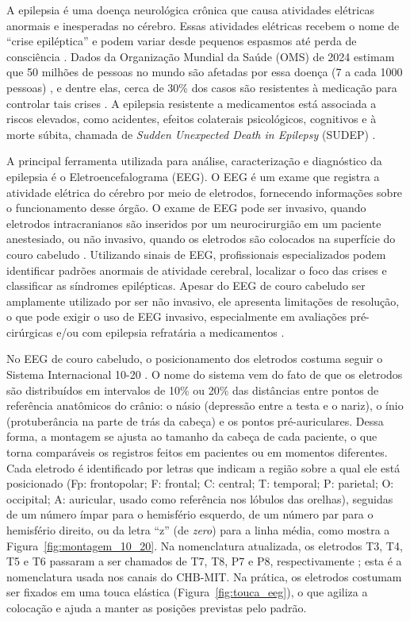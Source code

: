 \documentclass[]{article}
\begin{document}
	A epilepsia é uma doença neurológica crônica que causa atividades elétricas anormais e inesperadas no cérebro. Essas atividades elétricas recebem o nome de “crise epiléptica” e podem variar desde pequenos espasmos até perda de consciência \cite{einstein_epilepsia}.
	Dados da Organização Mundial da Saúde (OMS) de 2024 estimam que 50 milhões de pessoas no mundo são afetadas por essa doença (7 a cada 1000 pessoas) \cite{who_epilepsy}, e dentre elas, cerca de 30\% dos casos são resistentes à medicação para controlar tais crises \cite{pmc11960332}. A epilepsia resistente a medicamentos está associada a riscos elevados, como acidentes, efeitos colaterais psicológicos, cognitivos e à morte súbita, chamada de \textit{Sudden Unexpected Death in Epilepsy} (SUDEP) \cite{epilepsiabrasil_sudep}.
	
	A principal ferramenta utilizada para análise, caracterização e diagnóstico da epilepsia é o Eletroencefalograma (EEG). O EEG é um exame que registra a atividade elétrica do cérebro por meio de eletrodos, fornecendo informações sobre o funcionamento desse órgão. O exame de EEG pode ser invasivo, quando eletrodos intracranianos são inseridos por um neurocirurgião em um paciente anestesiado, ou não invasivo, quando os eletrodos são colocados na superfície do couro cabeludo \cite{alta_eeg}. Utilizando sinais de EEG, profissionais especializados podem identificar padrões anormais de atividade cerebral, localizar o foco das crises e classificar as síndromes epilépticas. Apesar do EEG de couro cabeludo ser amplamente utilizado por ser não invasivo, ele apresenta limitações de resolução, o que pode exigir o uso de EEG invasivo, especialmente em avaliações pré-cirúrgicas e/ou com epilepsia refratária a medicamentos \cite{epilepsycom_eeg}.

	No EEG de couro cabeludo, o posicionamento dos eletrodos costuma seguir o Sistema Internacional 10-20 \cite{jasper1958ten}. O nome do sistema vem do fato de que os eletrodos são distribuídos em intervalos de 10\% ou 20\% das distâncias entre pontos de referência anatômicos do crânio: o násio (depressão entre a testa e o nariz), o ínio (protuberância na parte de trás da cabeça) e os pontos pré-auriculares. Dessa forma, a montagem se ajusta ao tamanho da cabeça de cada paciente, o que torna comparáveis os registros feitos em pacientes ou em momentos diferentes. Cada eletrodo é identificado por letras que indicam a região sobre a qual ele está posicionado (Fp: frontopolar; F: frontal; C: central; T: temporal; P: parietal; O: occipital; A: auricular, usado como referência nos lóbulos das orelhas), seguidas de um número ímpar para o hemisfério esquerdo, de um número par para o hemisfério direito, ou da letra ``z'' (de \textit{zero}) para a linha média, como mostra a Figura~\ref{fig:montagem_10_20}. Na nomenclatura atualizada, os eletrodos T3, T4, T5 e T6 passaram a ser chamados de T7, T8, P7 e P8, respectivamente \cite{acharya2016acns}; esta é a nomenclatura usada nos canais do CHB-MIT. Na prática, os eletrodos costumam ser fixados em uma touca elástica (Figura~\ref{fig:touca_eeg}), o que agiliza a colocação e ajuda a manter as posições previstas pelo padrão.
\end{document}
